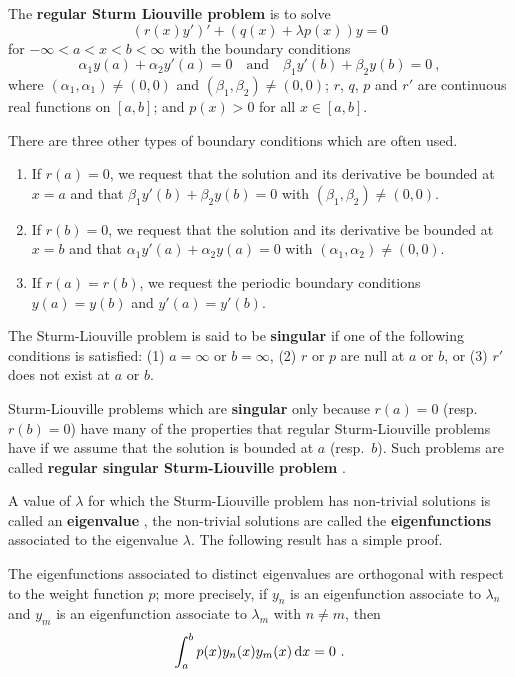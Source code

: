 The {\bfseries regular Sturm Liouville problem} is to solve 
\begin{equation} \label{spv_sturm_liou_equ}
(r(x) y')' + (q(x) + \lambda p(x)) y = 0
\end{equation}
for $-\infty < a < x < b < \infty$ with the boundary conditions
\[
\alpha_1 y(a) + \alpha_2 y'(a) = 0 \quad \text{and} \quad
\beta_1 y'(b) + \beta_2 y(b) = 0 \ ,
\]
where $(\alpha_1,\alpha_1)\neq (0,0)$ and $(\beta_1,\beta_2) \neq (0,0)$;
$r$, $q$, $p$ and $r'$ are continuous real functions on $[a,b]$; and
$p(x)>0$ for all $x \in [a,b]$.

There are three other types of boundary conditions which are often used.
\begin{enumerate}
\item If $r(a)=0$, we request that the solution and its derivative be bounded
at $x=a$ and that $\beta_1 y'(b) + \beta_2 y(b) = 0$ with
$(\beta_1,\beta_2) \neq (0,0)$.
\item If $r(b)=0$, we request that the solution and its derivative be bounded
at $x=b$ and that $\alpha_1 y'(a) + \alpha_2 y(a) = 0$ with
$(\alpha_1,\alpha_2) \neq (0,0)$.
\item If $r(a) = r(b)$, we request the periodic boundary conditions
$y(a) = y(b)$ and $y'(a) = y'(b)$.
\end{enumerate}

The Sturm-Liouville problem is said to be
{\bfseries singular} if one
of the following conditions is satisfied:
(1) $a=\infty$ or $b=\infty$, (2) $r$ or $p$ are null at $a$ or $b$, or
(3) $r'$ does not exist at $a$ or $b$.

Sturm-Liouville problems which are {\bfseries singular} only
because $r(a) = 0$ (resp.\ $r(b)=0$) have many of the properties
that regular Sturm-Liouville problems have if we assume that the
solution is bounded at $a$ (resp.\ $b$).  Such problems are called
{\bfseries regular singular Sturm-Liouville problem}%
. 

A value of $\lambda$ for which the Sturm-Liouville problem has non-trivial
solutions is called an {\bfseries eigenvalue}%
, the non-trivial solutions are
called the {\bfseries eigenfunctions}%
 associated to the eigenvalue
$\lambda$.  The following result has a simple proof.

\begin{prop}\label{SL_orthog}
The eigenfunctions associated to distinct eigenvalues are orthogonal with
respect to the weight function $p$; more precisely, if $y_n$ is an
eigenfunction associate to $\lambda_n$ and $y_m$ is an eigenfunction
associate to $\lambda_m$ with $n \neq m$, then
\begin{equation} \label{spv_sturm_liou_sp} 
\int_a^b p(x) y_n(x) y_m(x) \,\mathrm{d}{x} = 0 \ .
\end{equation}
\end{prop}

